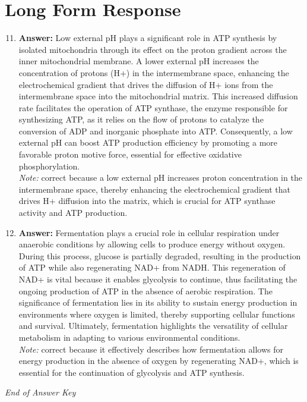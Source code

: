\documentclass[12pt]{article}
\begin{document}
\section*{Long Form Response}
\begin{enumerate}[label=\arabic*.]
\setcounter{enumi}{10}
\item \textbf{Answer:} Low external pH plays a significant role in ATP synthesis by isolated mitochondria through its effect on the proton gradient across the inner mitochondrial membrane. A lower external pH increases the concentration of protons (H+) in the intermembrane space, enhancing the electrochemical gradient that drives the diffusion of H+ ions from the intermembrane space into the mitochondrial matrix. This increased diffusion rate facilitates the operation of ATP synthase, the enzyme responsible for synthesizing ATP, as it relies on the flow of protons to catalyze the conversion of ADP and inorganic phosphate into ATP. Consequently, a low external pH can boost ATP production efficiency by promoting a more favorable proton motive force, essential for effective oxidative phosphorylation.
\\ \textit{Note:} correct because a low external pH increases proton concentration in the intermembrane space, thereby enhancing the electrochemical gradient that drives H+ diffusion into the matrix, which is crucial for ATP synthase activity and ATP production.
\item \textbf{Answer:} Fermentation plays a crucial role in cellular respiration under anaerobic conditions by allowing cells to produce energy without oxygen. During this process, glucose is partially degraded, resulting in the production of ATP while also regenerating NAD+ from NADH. This regeneration of NAD+ is vital because it enables glycolysis to continue, thus facilitating the ongoing production of ATP in the absence of aerobic respiration. The significance of fermentation lies in its ability to sustain energy production in environments where oxygen is limited, thereby supporting cellular functions and survival. Ultimately, fermentation highlights the versatility of cellular metabolism in adapting to various environmental conditions.
\\ \textit{Note:} correct because it effectively describes how fermentation allows for energy production in the absence of oxygen by regenerating NAD+, which is essential for the continuation of glycolysis and ATP synthesis.
\end{enumerate}

\vfill
\noindent\textit{End of Answer Key}
\end{document}
